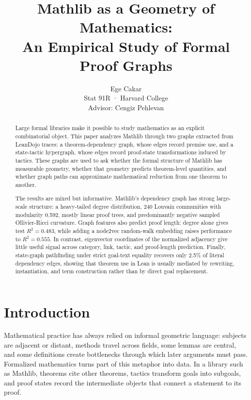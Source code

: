 \documentclass[11pt]{article}
\title{Mathlib as a Geometry of Mathematics:\\An Empirical Study of Formal Proof Graphs}
\author{Ege Cakar\\Stat 91R · Harvard College\\Advisor: Cengiz Pehlevan}
\date{}
\begin{document}
\maketitle

\begin{abstract}
Large formal libraries make it possible to study mathematics as an explicit
combinatorial object. This paper analyzes Mathlib through two graphs extracted
from LeanDojo traces: a theorem-dependency graph, whose edges record premise
use, and a state-tactic hypergraph, whose edges record proof-state
transformations induced by tactics. These graphs are used to ask whether the
formal structure of Mathlib has measurable geometry, whether that geometry
predicts theorem-level quantities, and whether graph paths can approximate
mathematical reduction from one theorem to another.

The results are mixed but informative. Mathlib's dependency graph has strong
large-scale structure: a heavy-tailed degree distribution, 240 Louvain
communities with modularity 0.592, mostly linear proof trees, and predominantly
negative sampled Ollivier-Ricci curvature. Graph features also predict proof
length: degree alone gives test $R^2=0.483$, while adding a node2vec
random-walk embedding raises performance to $R^2=0.555$. In contrast,
eigenvector coordinates of the normalized adjacency give little useful signal
across category, link, tactic, and proof-length prediction. Finally,
state-graph pathfinding under strict goal-text equality recovers only 2.5\% of
literal dependency edges, showing that theorem use in Lean is usually mediated
by rewriting, instantiation, and term construction rather than by direct goal
replacement.
\end{abstract}

\section{Introduction}

Mathematical practice has always relied on informal geometric language:
subjects are adjacent or distant, methods travel across fields, some lemmas are
central, and some definitions create bottlenecks through which later arguments
must pass. Formalized mathematics turns part of this metaphor into data. In a
library such as Mathlib, theorems cite other theorems, tactics transform goals
into subgoals, and proof states record the intermediate objects that connect a
statement to its proof.
\end{document}
